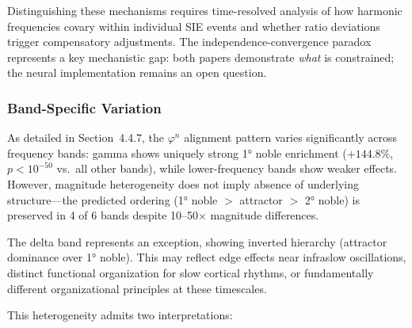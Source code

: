 \documentclass[11pt,a4paper]{article}
\newcommand{\phisym}{\varphi}
\begin{document}
Distinguishing these mechanisms requires time-resolved analysis of how harmonic frequencies covary within individual SIE events and whether ratio deviations trigger compensatory adjustments. The independence-convergence paradox represents a key mechanistic gap: both papers demonstrate \textit{what} is constrained; the neural implementation remains an open question.

\subsubsection{Band-Specific Variation}

As detailed in Section~4.4.7, the $\phisym^n$ alignment pattern varies significantly across frequency bands: gamma shows uniquely strong 1° noble enrichment ($+144.8\%$, $p < 10^{-50}$ vs.\ all other bands), while lower-frequency bands show weaker effects. However, magnitude heterogeneity does not imply absence of underlying structure---the predicted ordering (1° noble $>$ attractor $>$ 2° noble) is preserved in 4 of 6 bands despite 10--50$\times$ magnitude differences.

The delta band represents an exception, showing inverted hierarchy (attractor dominance over 1° noble). This may reflect edge effects near infraslow oscillations, distinct functional organization for slow cortical rhythms, or fundamentally different organizational principles at these timescales.

This heterogeneity admits two interpretations:
\end{document}
